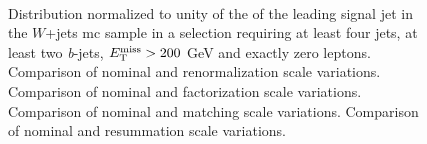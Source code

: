 \begin{figure}[h!]
\centering 
{}
\\
\caption{Distribution normalized to unity of the \pt of the leading signal jet in the $W$+jets \gls{mc} sample in a selection requiring at least four jets, at least two \textit{b}-jets, $E_{\rm T}^{\mathrm{miss}}>200$ GeV and exactly zero leptons. 
 Comparison of nominal and renormalization scale variations.
 Comparison of nominal and factorization scale variations.
 Comparison of nominal and matching scale variations.
 Comparison of nominal and resummation scale variations.
}\label{fig:W_met_0L_syst}
\end{figure}


